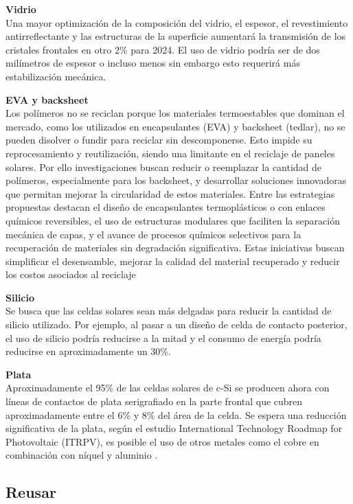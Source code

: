 \textbf{Vidrio}\\
Una mayor optimización de la composición del vidrio, el espesor, el revestimiento antirreflectante y las estructuras de la superficie aumentará la transmisión de los cristales frontales en otro 2\% para 2024. El uso de vidrio podría ser de dos milímetros de espesor o incluso menos sin embargo esto requerirá más estabilización mecánica. 

\textbf{EVA y backsheet}\\
 Los polímeros no se reciclan porque los materiales termoestables que dominan el mercado, como los utilizados en encapsulantes (EVA) y backsheet (tedlar), no se pueden disolver o fundir para reciclar sin descomponerse. Esto impide su reprocesamiento y reutilización, siendo una limitante en el reciclaje de paneles solares. Por ello investigaciones buscan reducir o reemplazar la cantidad de polímeros, especialmente para los backsheet, y desarrollar soluciones innovadoras que permitan mejorar la circularidad de estos materiales. Entre las estrategias propuestas destacan el diseño de encapsulantes termoplásticos o con enlaces químicos reversibles, el uso de estructuras modulares que faciliten la separación mecánica de capas, y el avance de procesos químicos selectivos para la recuperación de materiales sin degradación significativa. Estas iniciativas buscan simplificar el desensamble, mejorar la calidad del material recuperado y reducir los costos asociados al reciclaje \citep{Kang2021, Chen2023, IEAPVPS2020}


\textbf{Silicio}\\
Se busca que las celdas solares sean más delgadas para reducir la cantidad de silicio utilizado. Por ejemplo, al pasar a un diseño de celda de contacto posterior, el uso de silicio podría reducirse a la mitad y el consumo de energía podría reducirse en aproximadamente un 30\%.

\textbf{Plata}\\
Aproximadamente el 95\% de las celdas solares de c-Si se producen ahora con líneas de contactos de plata serigrafiado en la parte frontal que cubren aproximadamente entre el 6\% y 8\% del área de la celda. Se espera una reducción significativa de la plata, según el estudio International Technology Roadmap for Photovoltaic (ITRPV), es posible el uso de otros metales como el cobre en combinación con níquel y aluminio \citep{Irena2016}.

 \subsection{Reusar}
\label{sec:reusar}
 
